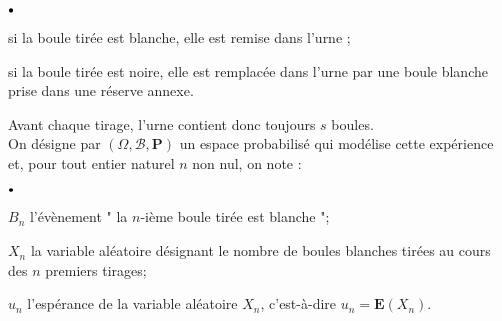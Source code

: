 \documentclass[11pt]{article}%
\begin{document}
\begin{noliste}{$\scriptstyle \bullet$}
\item si la boule tirée est blanche, elle est remise dans l'urne ;

\item si la boule tirée est noire, elle est remplacée dans l'urne par
une boule blanche prise dans une réserve annexe.
\end{noliste}

\noindent Avant chaque tirage, l'urne contient donc toujours $s$
boules.\\
On désigne par $(\Omega,\mathcal{B},\mathbf{P})$ un espace probabilisé
qui
modélise cette expérience et, pour tout entier naturel $n$ non nul, on
note :

\begin{noliste}{$\scriptstyle \bullet$}
\item $B_{n}$ l'évènement " la $n$-ième boule tirée est blanche ";

\item $X_{n}$ la variable aléatoire désignant le nombre de boules
blanches
tirées au cours des $n$ premiers tirages;

\item $u_{n}$ l'espérance de la variable aléatoire $X_{n}$,
c'est-à-dire $u_{n} = \mathbf{E}(X_{n})$.
\end{noliste}
\end{document}
